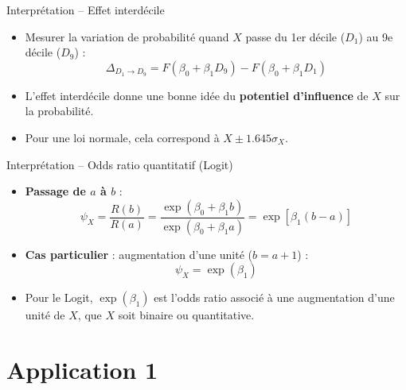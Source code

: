\documentclass[11pt,aspectratio=169]{beamer}
\begin{document}
\begin{frame}{Interprétation -- Effet interdécile}

\begin{itemize}

\item Mesurer la variation de probabilité quand $X$ passe du 1er décile
  ($D_1$) au 9e décile ($D_9$) :
  \[
  \Delta_{D_1 \to D_9} = F(\beta_0 + \beta_1 D_9) - F(\beta_0 + \beta_1 D_1)
  \]

\item L'effet interdécile donne une bonne idée du \textbf{potentiel
  d'influence} de $X$ sur la probabilité.\newline

\item Pour une loi normale, cela correspond à $X \pm 1.645 \sigma_X$.

\end{itemize}

\end{frame}

\begin{frame}{Interprétation -- Odds ratio quantitatif (Logit)}

\begin{itemize}

\item \textbf{Passage de $a$ à $b$} :
  \[
  \psi_X = \frac{R(b)}{R(a)} = \frac{\exp(\beta_0 + \beta_1 b)}{\exp(\beta_0 + \beta_1 a)} = \exp[\beta_1(b-a)]
  \]

\item \textbf{Cas particulier} : augmentation d'une unité ($b = a + 1$) :
  \[
  \boxed{\psi_X = \exp(\beta_1)}
  \]

\item Pour le Logit, $\exp(\beta_1)$ est l'odds ratio associé à une
  augmentation d'une unité de $X$, que $X$ soit binaire ou quantitative.

\end{itemize}

\end{frame}

\section{Application 1}
\end{document}

